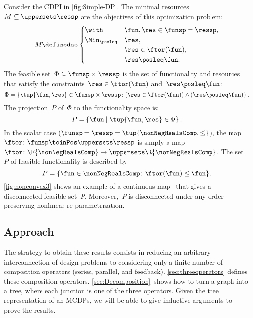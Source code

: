 \begin{example}
  \label{exa:one}
  Consider the CDPI in \cref{fig:Simple-DP}.
  The \uline{m}inimal resources~$M\subseteq\uppersets \ressp$ are the objectives of this optimization problem:
  \begin{equation*}
    M\definedas\begin{cases}
                 \with & \fun,\res\in\funsp=\ressp,\\
                 \Min_{\posleq} & \res,\\
                 & \res\in\ftor(\fun),\\
                 & \res\posleq\fun.
    \end{cases}
  \end{equation*}
  The \uline{fea}sible %
  set~$\Phi\subseteq\funsp\times\ressp$ is
  the set of functionality and resources that satisfy the constraints~$\res\in\ftor(\fun)$
  and~$\res\posleq\fun$:
  \begin{equation}
    \Phi=\left\{ \tup{\fun,\res}\in\funsp\times\ressp\colon (\res\in\ftor(\fun))\wedge(\res\posleq\fun)\right\} .\label{eq:feasible}
  \end{equation}
  The \uline{p}rojection~$P$ of~$\Phi$ to the functionality space
  is:
  \begin{equation*}
    P=\left\{ \fun\mid\tup{\fun,\res} \in\Phi\right\}.
  \end{equation*}
  In the scalar case ($\funsp=\ressp=\tup{\nonNegRealsComp,\leq}$),
  the map~$\ftor\colon\funsp\toinPos\uppersets \ressp$ is simply a map~$\ftor\colon\F{\nonNegRealsComp}\to \uppersets\R{\nonNegRealsComp}$.
  The set~$P$ of feasible functionality is described by
  \begin{equation}
    P=\{\fun\in\nonNegRealsComp\colon \ftor(\fun)\leq\fun\}.\label{eq:Pfeasible}
  \end{equation}
  \cref{fig:nonconvex3} shows an example of a continuous map~\ftor
  that gives a disconnected feasible set~$P$. Moreover,~$P$ is disconnected
  under any order-preserving nonlinear re-parametrization.

\end{example}

\subsection{Approach}

The strategy to obtain these results  consists in reducing an arbitrary
interconnection of design problems to considering only a finite
number of composition operators (series, parallel, and feedback).
\cref{sec:threeoperators} defines these composition operators. \cref{sec:Decomposition}~shows
how to turn a graph into a tree, where each junction is one of the
three operators. Given the tree representation of an MCDPs, we will
be able to give inductive arguments to prove the results.

